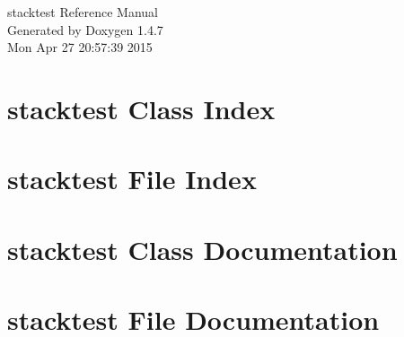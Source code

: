 \documentclass[a4paper]{book}
\begin{document}
\begin{titlepage}
\vspace*{7cm}
\begin{center}
{\Large stacktest Reference Manual}\\
\vspace*{1cm}
{\large Generated by Doxygen 1.4.7}\\
\vspace*{0.5cm}
{\small Mon Apr 27 20:57:39 2015}\\
\end{center}
\end{titlepage}
\clearemptydoublepage
{}
\tableofcontents
\clearemptydoublepage
{}
\chapter{stacktest Class Index}

\chapter{stacktest File Index}

\chapter{stacktest Class Documentation}




\chapter{stacktest File Documentation}










\printindex
\end{document}
